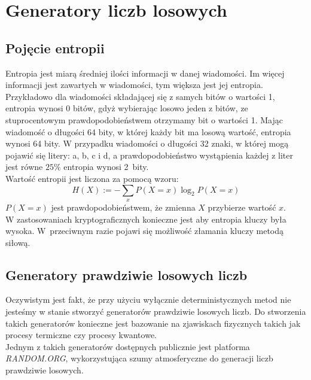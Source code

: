 \section{Generatory liczb losowych}

\subsection{Pojęcie entropii}
Entropia jest miarą średniej ilości informacji w danej wiadomości. 
Im więcej informacji jest zawartych w wiadomości, tym większa jest jej entropia. \\
Przykładowo dla wiadomości składającej się z samych bitów o wartości 1, entropia wynosi 0 bitów, gdyż wybierając 
losowo jeden z bitów, ze stuprocentowym prawdopodobieństwem otrzymamy bit o wartości 1.
Mając wiadomość o długości 64 bity, w której każdy bit ma losową wartość, entropia wynosi 64 bity.
W przypadku wiadomości o długości 32 znaki, w której mogą pojawić się litery: a, b, c i d,
a prawdopodobieństwo wystąpienia każdej z liter jest równe $25\%$ entropia wynosi 2~bity. \\
Wartość entropii jest liczona za pomocą wzoru:
$$
	H(X) := - \sum_x P(X=x) \log_2 P(X=x)
$$
$P(X=x)$ jest prawdopodobieństwem, że zmienna $X$ przybierze wartość $x$. \\
W zastosowaniach kryptograficznych konieczne jest aby entropia kluczy była wysoka. 
W~przeciwnym razie pojawi się możliwość złamania kluczy metodą siłową.

\subsection{Generatory prawdziwie losowych liczb}
Oczywistym jest fakt, że przy użyciu wyłącznie deterministycznych metod nie jesteśmy w stanie stworzyć
generatorów prawdziwie losowych liczb. Do stworzenia takich generatorów konieczne jest bazowanie na 
zjawiskach fizycznych takich jak procesy termiczne czy procesy kwantowe. \\
Jednym z takich generatorów dostępnych publicznie jest platforma \textit{RANDOM.ORG}, wykorzystująca 
szumy atmosferyczne do generacji liczb prawdziwie losowych.

